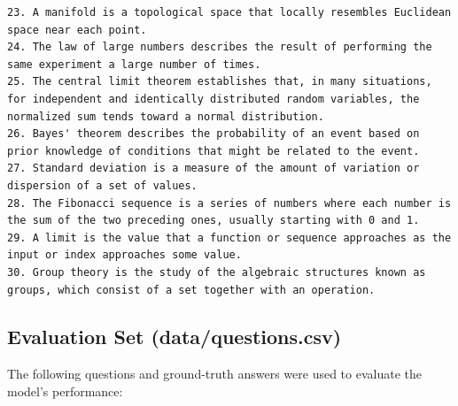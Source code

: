 \documentclass[12pt,a4paper]{article}
\begin{document}
\begin{lstlisting}[basicstyle=\ttfamily\scriptsize]
23. A manifold is a topological space that locally resembles Euclidean space near each point.
24. The law of large numbers describes the result of performing the same experiment a large number of times.
25. The central limit theorem establishes that, in many situations, for independent and identically distributed random variables, the normalized sum tends toward a normal distribution.
26. Bayes' theorem describes the probability of an event based on prior knowledge of conditions that might be related to the event.
27. Standard deviation is a measure of the amount of variation or dispersion of a set of values.
28. The Fibonacci sequence is a series of numbers where each number is the sum of the two preceding ones, usually starting with 0 and 1.
29. A limit is the value that a function or sequence approaches as the input or index approaches some value.
30. Group theory is the study of the algebraic structures known as groups, which consist of a set together with an operation.
\end{lstlisting}

\subsection{Evaluation Set (data/questions.csv)}
The following questions and ground-truth answers were used to evaluate the model's performance:
\end{document}
